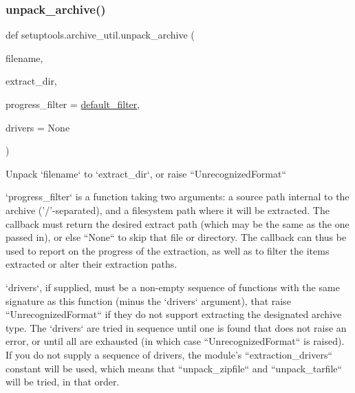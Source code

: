 \subsubsection{\texorpdfstring{unpack\+\_\+archive()}{unpack\_archive()}}
{\footnotesize\ttfamily def setuptools.\+archive\+\_\+util.\+unpack\+\_\+archive (\begin{DoxyParamCaption}\item[{}]{filename,  }\item[{}]{extract\+\_\+dir,  }\item[{}]{progress\+\_\+filter = {\ttfamily \hyperlink{namespacesetuptools_1_1archive__util_adede8e93e57be04915ea0d27831b654b}{default\+\_\+filter}},  }\item[{}]{drivers = {\ttfamily None} }\end{DoxyParamCaption})}

\begin{DoxyVerb}Unpack `filename` to `extract_dir`, or raise ``UnrecognizedFormat``

`progress_filter` is a function taking two arguments: a source path
internal to the archive ('/'-separated), and a filesystem path where it
will be extracted.  The callback must return the desired extract path
(which may be the same as the one passed in), or else ``None`` to skip
that file or directory.  The callback can thus be used to report on the
progress of the extraction, as well as to filter the items extracted or
alter their extraction paths.

`drivers`, if supplied, must be a non-empty sequence of functions with the
same signature as this function (minus the `drivers` argument), that raise
``UnrecognizedFormat`` if they do not support extracting the designated
archive type.  The `drivers` are tried in sequence until one is found that
does not raise an error, or until all are exhausted (in which case
``UnrecognizedFormat`` is raised).  If you do not supply a sequence of
drivers, the module's ``extraction_drivers`` constant will be used, which
means that ``unpack_zipfile`` and ``unpack_tarfile`` will be tried, in that
order.
\end{DoxyVerb}
 \mbox{\label{namespacesetuptools_1_1archive__util_a6ad75ce90d1cbed27a1d5a1dc6e4dda3}} 
